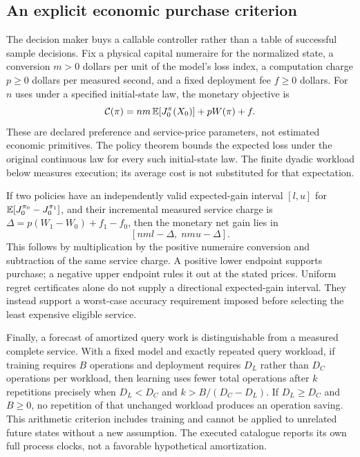 \subsection{An explicit economic purchase criterion}\label{sec:purchase64}
The decision maker buys a callable controller rather than a table of successful sample decisions. Fix a physical capital numeraire for the normalized state, a conversion $m>0$ dollars per unit of the model's loss index, a computation charge $p\ge0$ dollars per measured second, and a fixed deployment fee $f\ge0$ dollars. For $n$ uses under a specified initial-state law, the monetary objective is
\[
 \mathcal C(\pi)=nm\,\mathbb E[J_0^\pi(X_0)]+pW(\pi)+f.
\]
These are declared preference and service-price parameters, not estimated economic primitives. The policy theorem bounds the expected loss under the original continuous law for every such initial-state law. The finite dyadic workload below measures execution; its average cost is not substituted for that expectation.

If two policies have an independently valid expected-gain interval $[l,u]$ for $\mathbb E[J_0^{\pi_0}-J_0^{\pi_1}]$, and their incremental measured service charge is $\Delta=p(W_1-W_0)+f_1-f_0$, then the monetary net gain lies in
\[
 [nm l-\Delta,\;nm u-\Delta].
\]
This follows by multiplication by the positive numeraire conversion and subtraction of the same service charge. A positive lower endpoint supports purchase; a negative upper endpoint rules it out at the stated prices. Uniform regret certificates alone do not supply a directional expected-gain interval. They instead support a worst-case accuracy requirement imposed before selecting the least expensive eligible service.

Finally, a forecast of amortized query work is distinguishable from a measured complete service. With a fixed model and exactly repeated query workload, if training requires $B$ operations and deployment requires $D_L$ rather than $D_C$ operations per workload, then learning uses fewer total operations after $k$ repetitions precisely when $D_L<D_C$ and $k>B/(D_C-D_L)$. If $D_L\ge D_C$ and $B\ge0$, no repetition of that unchanged workload produces an operation saving. This arithmetic criterion includes training and cannot be applied to unrelated future states without a new assumption. The executed catalogue reports its own full process clocks, not a favorable hypothetical amortization.
